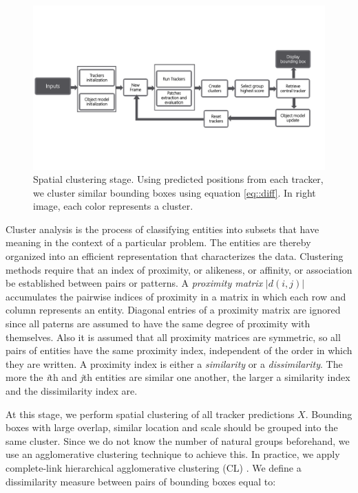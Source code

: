 \begin{figure}[b!]
\centering
\includegraphics[page=4, width=0.9\linewidth, trim= 0.4cm 5.5cm 6.5cm 5cm,
                 clip=true]{Figures/global_diagram}
\caption[Spatial clustering stage]{\small Spatial clustering stage. Using
        predicted positions from each tracker, we cluster similar bounding boxes using
        equation \ref{eq::diff}. In right image, each color represents a cluster.}
\label{fig::clustering}
\end{figure}

Cluster analysis is the process of classifying entities into subsets that have
meaning in the context of a particular problem. The entities are thereby
organized into an efficient representation that characterizes the data.
Clustering methods require that an index of proximity, or alikeness, or
affinity, or association be established between pairs or patterns. A
\textit{proximity matrix} $|d(i, j)|$ accumulates the pairwise indices of
proximity in a matrix in which each row and column represents an entity.
Diagonal entries of a proximity matrix are ignored since all paterns are
assumed to have the same degree of proximity with themselves. Also it is
assumed that all proximity matrices are symmetric, so all pairs of entities have
the same proximity index, independent of the order in which they are written. A
proximity index is either a \textit{similarity} or a \textit{dissimilarity}.
The more the \textit{i}th and \textit{j}th entities are similar one another, the
larger a similarity index and the dissimilarity index are.

At this stage, we perform spatial clustering of all tracker predictions $X$.
Bounding boxes with large overlap, similar location and scale should be grouped
into the same cluster.
Since we do not know the number of natural groups beforehand, we use
an agglomerative clustering technique to achieve this. In practice,
we apply complete-link hierarchical agglomerative clustering (CL)
\cite{Jain88}.
We define a dissimilarity measure between pairs of bounding boxes equal to:

